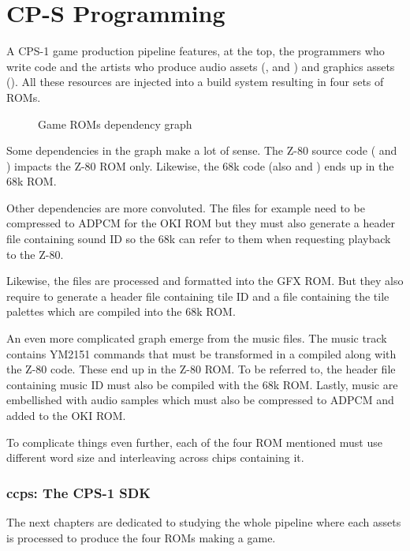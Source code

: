 \chapter{CP-S Programming}

A CPS-1 game production pipeline features, at the top, the programmers who write code and the artists who produce audio assets (, and ) and graphics assets (). All these resources are injected into a build system resulting in four sets of ROMs. 

 \begin{figure}[H]
\caption*{Game ROMs dependency graph}
\end{figure}

Some dependencies in the graph make a lot of sense. The Z-80 source code ( and ) impacts the Z-80 ROM only. Likewise, the 68k code (also  and ) ends up in the 68k ROM.

Other dependencies are more convoluted. The  files for example need to be compressed to ADPCM for the OKI ROM but they must also generate a  header file containing sound ID so the 68k can refer to them when requesting playback to the Z-80.

Likewise, the  files are processed and formatted into the GFX ROM. But they also require to generate a  header file containing tile ID and a  file containing the tile palettes which are compiled into the 68k ROM. 

An even more complicated graph emerge from the music  files. The music track contains YM2151 commands that must be transformed in a  compiled along with the Z-80 code. These end up in the Z-80 ROM. To be referred to, the header file containing music ID must also be compiled with the 68k ROM. Lastly, music are embellished with audio samples which must also be compressed to ADPCM and added to the OKI ROM.

To complicate things even further, each of the four ROM mentioned must use different word size and interleaving across chips containing it.

\subsection{ccps: The CPS-1 SDK}
The next chapters are dedicated to studying the whole pipeline where each assets is processed to produce the four ROMs making a game. 


